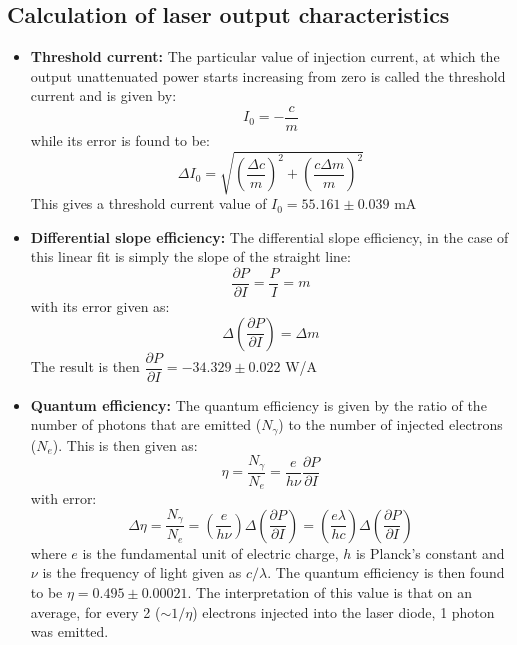 \subsection{Calculation of laser output characteristics}
\begin{itemize}
\item \textbf{Threshold current:} The particular value of injection current, at which the output unattenuated power starts increasing from zero is called the threshold current and is given by:
\begin{equation}
I_{0}=-\dfrac{c}{m}
\end{equation} 
while its error is found to be:
\begin{equation}
\Delta I_{0}=\sqrt{\left(\dfrac{\Delta c}{m}\right)^{2}+\left(\dfrac{c \Delta m}{m}\right)^{2}}
\end{equation}
This gives a threshold current value of $I_{0}=55.161\pm 0.039$ mA
\item \textbf{Differential slope efficiency:} The differential slope efficiency, in the case of this linear fit is simply the slope of the straight line:
\begin{equation}
\dfrac{\partial P}{\partial I}=\dfrac{P}{I}=m
\end{equation}
with its error given as:
\begin{equation}
\Delta \left(\dfrac{\partial P}{\partial I}\right)=\Delta m
\end{equation}
The result is then $\dfrac{\partial P}{\partial I}=-34.329\pm 0.022$ W/A
\item \textbf{Quantum efficiency:} The quantum efficiency is given by the ratio of the number of photons that are emitted ($N_{\gamma}$) to the number of injected electrons ($N_{e}$). This is then given as:
\begin{equation}
\eta=\dfrac{N_{\gamma}}{N_{e}}=\dfrac{e}{h \nu}\dfrac{\partial P}{\partial I}
\end{equation}
with error:
\begin{equation}
\Delta \eta=\dfrac{N_{\gamma}}{N_{e}}=\left(\dfrac{e}{h \nu}\right)\Delta\left(\dfrac{\partial P}{\partial I}\right)=\left(\dfrac{e\lambda}{hc}\right)\Delta\left(\dfrac{\partial P}{\partial I}\right)
\end{equation}
where $e$ is the fundamental unit of electric charge, $h$ is Planck's constant and $\nu$ is the frequency of light given as $c/\lambda$. The quantum efficiency is then found to be $\eta=0.495\pm 0.00021$. The interpretation of this value is that on an average, for every 2 ($\sim 1/\eta$) electrons injected into the laser diode, 1 photon was emitted.
\end{itemize}

